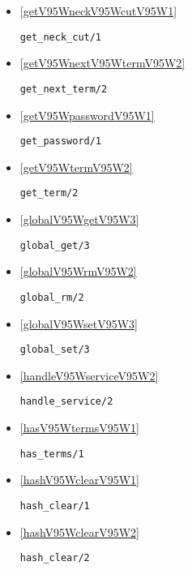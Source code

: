 \begin{itemize}
\item \ref{getV95WneckV95WcutV95W1} 
\begin{verbatim}
get_neck_cut/1
\end{verbatim}

\item \ref{getV95WnextV95WtermV95W2} 
\begin{verbatim}
get_next_term/2
\end{verbatim}

\item \ref{getV95WpasswordV95W1} 
\begin{verbatim}
get_password/1
\end{verbatim}

\item \ref{getV95WtermV95W2} 
\begin{verbatim}
get_term/2
\end{verbatim}

\item \ref{globalV95WgetV95W3} 
\begin{verbatim}
global_get/3
\end{verbatim}

\item \ref{globalV95WrmV95W2} 
\begin{verbatim}
global_rm/2
\end{verbatim}

\item \ref{globalV95WsetV95W3} 
\begin{verbatim}
global_set/3
\end{verbatim}

\item \ref{handleV95WserviceV95W2} 
\begin{verbatim}
handle_service/2
\end{verbatim}

\item \ref{hasV95WtermsV95W1} 
\begin{verbatim}
has_terms/1
\end{verbatim}

\item \ref{hashV95WclearV95W1} 
\begin{verbatim}
hash_clear/1
\end{verbatim}

\item \ref{hashV95WclearV95W2} 
\begin{verbatim}
hash_clear/2
\end{verbatim}


\end{itemize}
